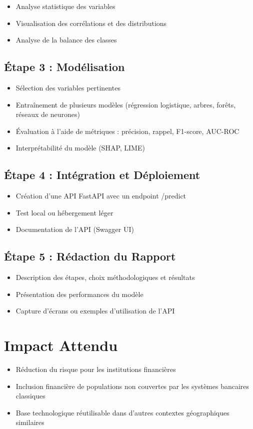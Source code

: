 \documentclass[12pt]{article}
\begin{document}
	\begin{itemize}[label=--]
		\item Analyse statistique des variables
		\item Visualisation des corrélations et des distributions
		\item Analyse de la balance des classes
	\end{itemize}
	
	\subsection{Étape 3 : Modélisation}
	
	\begin{itemize}[label=--]
		\item Sélection des variables pertinentes
		\item Entraînement de plusieurs modèles (régression logistique, arbres, forêts, réseaux de neurones)
		\item Évaluation à l’aide de métriques : précision, rappel, F1-score, AUC-ROC
		\item Interprétabilité du modèle (SHAP, LIME)
	\end{itemize}
	
	\subsection{Étape 4 : Intégration et Déploiement}
	
	\begin{itemize}[label=--]
		\item Création d’une API FastAPI avec un endpoint /predict
		\item Test local ou hébergement léger
		\item Documentation de l’API (Swagger UI)
	\end{itemize}
	
	\subsection{Étape 5 : Rédaction du Rapport}
	
	\begin{itemize}[label=--]
		\item Description des étapes, choix méthodologiques et résultats
		\item Présentation des performances du modèle
		\item Capture d’écrans ou exemples d’utilisation de l’API
	\end{itemize}
	
	\section{Impact Attendu}
	
	\begin{itemize}[label=--]
		\item Réduction du risque pour les institutions financières
		\item Inclusion financière de populations non couvertes par les systèmes bancaires classiques
		\item Base technologique réutilisable dans d’autres contextes géographiques similaires
	\end{itemize}
	
\end{document}
